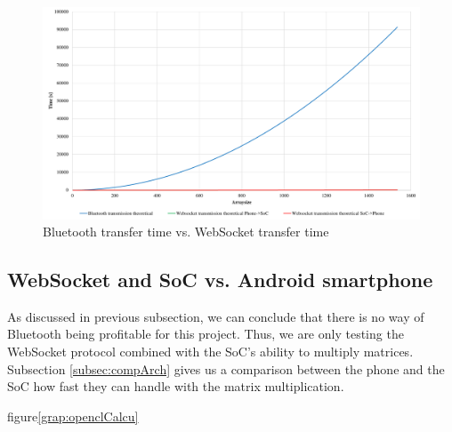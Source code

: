 \documentclass[a4paper, 11pt]{report}
\begin{document}
\begin{figure}[ht]
\centering
\includegraphics[scale=0.45]{images/BluetoothVsWebsocket.pdf}
\caption{Bluetooth transfer time vs. WebSocket transfer time}\label{graph:bluetoothVsWebsocket}
\end{figure}


\subsection{WebSocket and SoC vs. Android smartphone}
As discussed in previous subsection, we can conclude that there is no way of Bluetooth being profitable for this project. Thus, we are only testing the WebSocket protocol combined with the SoC's ability to multiply matrices. Subsection \ref{subsec:compArch} gives us a comparison between the phone and the SoC how fast they can handle with the matrix multiplication. 



figure\ref{grap:openclCalcu}






























\end{document}
